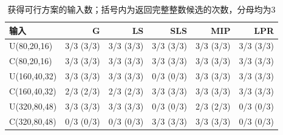 \begin{table}[htbp]
\centering\small
\caption{获得可行方案的输入数；括号内为返回完整整数候选的次数，分母均为3}\label{tab:success}
\begin{tabular}{lrrrrr}\toprule
输入 & G & LS & SLS & MIP & LPR \\\midrule
U(80,20,16) & 3/3 (3/3) & 3/3 (3/3) & 3/3 (3/3) & 3/3 (3/3) & 3/3 (3/3) \\
C(80,20,16) & 3/3 (3/3) & 3/3 (3/3) & 3/3 (3/3) & 3/3 (3/3) & 3/3 (3/3) \\
U(160,40,32) & 3/3 (3/3) & 3/3 (3/3) & 0/3 (0/3) & 3/3 (3/3) & 3/3 (3/3) \\
C(160,40,32) & 2/3 (2/3) & 2/3 (2/3) & 3/3 (3/3) & 3/3 (3/3) & 3/3 (3/3) \\
U(320,80,48) & 3/3 (3/3) & 3/3 (3/3) & 0/3 (0/3) & 2/3 (2/3) & 0/3 (0/3) \\
C(320,80,48) & 0/3 (0/3) & 0/3 (0/3) & 3/3 (3/3) & 3/3 (3/3) & 0/3 (0/3) \\
\bottomrule\end{tabular}
\end{table}
